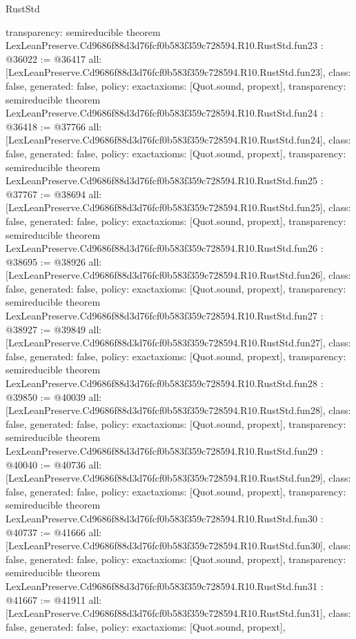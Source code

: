 \begin{lexlean}{RustStd}
\begin{coremodule}
{  transparency: semireducible
}
theorem LexLeanPreserve.Cd9686f88d3d76fcf0b583f359c728594.R10.RustStd.fun23 : @36022 := @36417 {
  all: [LexLeanPreserve.Cd9686f88d3d76fcf0b583f359c728594.R10.RustStd.fun23],
  class: false,
  generated: false,
  policy: exact{axioms: [Quot.sound, propext]},
  transparency: semireducible
}
theorem LexLeanPreserve.Cd9686f88d3d76fcf0b583f359c728594.R10.RustStd.fun24 : @36418 := @37766 {
  all: [LexLeanPreserve.Cd9686f88d3d76fcf0b583f359c728594.R10.RustStd.fun24],
  class: false,
  generated: false,
  policy: exact{axioms: [Quot.sound, propext]},
  transparency: semireducible
}
theorem LexLeanPreserve.Cd9686f88d3d76fcf0b583f359c728594.R10.RustStd.fun25 : @37767 := @38694 {
  all: [LexLeanPreserve.Cd9686f88d3d76fcf0b583f359c728594.R10.RustStd.fun25],
  class: false,
  generated: false,
  policy: exact{axioms: [Quot.sound, propext]},
  transparency: semireducible
}
theorem LexLeanPreserve.Cd9686f88d3d76fcf0b583f359c728594.R10.RustStd.fun26 : @38695 := @38926 {
  all: [LexLeanPreserve.Cd9686f88d3d76fcf0b583f359c728594.R10.RustStd.fun26],
  class: false,
  generated: false,
  policy: exact{axioms: [Quot.sound, propext]},
  transparency: semireducible
}
theorem LexLeanPreserve.Cd9686f88d3d76fcf0b583f359c728594.R10.RustStd.fun27 : @38927 := @39849 {
  all: [LexLeanPreserve.Cd9686f88d3d76fcf0b583f359c728594.R10.RustStd.fun27],
  class: false,
  generated: false,
  policy: exact{axioms: [Quot.sound, propext]},
  transparency: semireducible
}
theorem LexLeanPreserve.Cd9686f88d3d76fcf0b583f359c728594.R10.RustStd.fun28 : @39850 := @40039 {
  all: [LexLeanPreserve.Cd9686f88d3d76fcf0b583f359c728594.R10.RustStd.fun28],
  class: false,
  generated: false,
  policy: exact{axioms: [Quot.sound, propext]},
  transparency: semireducible
}
theorem LexLeanPreserve.Cd9686f88d3d76fcf0b583f359c728594.R10.RustStd.fun29 : @40040 := @40736 {
  all: [LexLeanPreserve.Cd9686f88d3d76fcf0b583f359c728594.R10.RustStd.fun29],
  class: false,
  generated: false,
  policy: exact{axioms: [Quot.sound, propext]},
  transparency: semireducible
}
theorem LexLeanPreserve.Cd9686f88d3d76fcf0b583f359c728594.R10.RustStd.fun30 : @40737 := @41666 {
  all: [LexLeanPreserve.Cd9686f88d3d76fcf0b583f359c728594.R10.RustStd.fun30],
  class: false,
  generated: false,
  policy: exact{axioms: [Quot.sound, propext]},
  transparency: semireducible
}
theorem LexLeanPreserve.Cd9686f88d3d76fcf0b583f359c728594.R10.RustStd.fun31 : @41667 := @41911 {
  all: [LexLeanPreserve.Cd9686f88d3d76fcf0b583f359c728594.R10.RustStd.fun31],
  class: false,
  generated: false,
  policy: exact{axioms: [Quot.sound, propext]},
}
\end{coremodule}
\end{lexlean}
